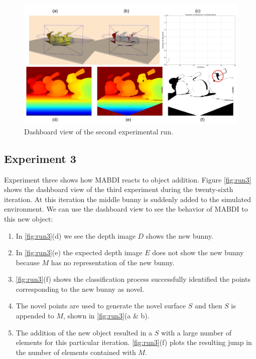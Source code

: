 \begin{figure}[h]%
\centering
  \includegraphics[width=\textwidth]{figures/diagram_run2.pdf}
  \caption{Dashboard view of the second experimental run.}
  \label{fig:run2}
\end{figure}

\subsection{Experiment 3}

Experiment three shows how MABDI reacts to object addition. Figure
\ref{fig:run3} shows the dashboard view of the third experiment during the
twenty-sixth iteration. At this iteration the middle bunny is suddenly added to
the simulated environment. We can use the dashboard view to see the behavior of
MABDI to this new object:
\begin{enumerate}
  \item In \ref{fig:run3}(d) we see the depth image $D$ shows the new bunny.
  \item In \ref{fig:run3}(e) the expected depth image $E$ does not show the new
  bunny because $M$ has no representation of the new bunny.
  \item \ref{fig:run3}(f) shows the classification process successfully
  identified the points corresponding to the new bunny as novel.
  \item The novel points are used to generate the novel surface $S$ and then $S$
  is appended to $M$, shown in \ref{fig:run3}(a \& b).
  \item The addition of the new object resulted in a $S$ with a large number of
  elements for this particular iteration. \ref{fig:run3}(f) plots the resulting
  jump in the number of elements contained with $M$.
\end{enumerate}

